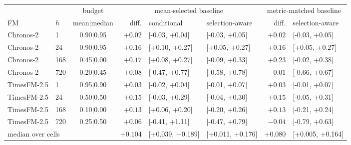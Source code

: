 \begin{tabular}{llcrllrl}
\toprule
 & & budget & \multicolumn{3}{c}{mean-selected baseline} & \multicolumn{2}{c}{metric-matched baseline} \\
\cmidrule(lr){4-6}\cmidrule(lr){7-8}
FM & $h$ & mean$|$median & diff. & conditional & selection-aware & diff. & selection-aware \\
\midrule
Chronos-2 & 1 & 0.90$|$0.95 & $+0.02$ & [-0.03, +0.04] & [-0.03, +0.05] & $+0.02$ & [-0.03, +0.05] \\
Chronos-2 & 24 & 0.90$|$0.95 & $+0.16$ & [+0.10, +0.27] & [+0.05, +0.27] & $+0.16$ & [+0.05, +0.27] \\
Chronos-2 & 168 & 0.45$|$0.00 & $+0.17$ & [+0.08, +0.27] & [-0.09, +0.33] & $+0.23$ & [-0.02, +0.38] \\
Chronos-2 & 720 & 0.20$|$0.45 & $+0.08$ & [-0.47, +0.77] & [-0.58, +0.78] & $-0.01$ & [-0.66, +0.67] \\
TimesFM-2.5 & 1 & 0.95$|$0.90 & $+0.03$ & [-0.02, +0.04] & [-0.01, +0.07] & $+0.03$ & [-0.01, +0.07] \\
TimesFM-2.5 & 24 & 0.50$|$0.50 & $+0.15$ & [-0.03, +0.29] & [-0.04, +0.30] & $+0.15$ & [-0.05, +0.31] \\
TimesFM-2.5 & 168 & 0.10$|$0.00 & $+0.13$ & [+0.06, +0.20] & [-0.20, +0.26] & $+0.13$ & [-0.21, +0.24] \\
TimesFM-2.5 & 720 & 0.25$|$0.50 & $+0.06$ & [-0.41, +1.11] & [-0.47, +0.79] & $-0.04$ & [-0.79, +0.63] \\
\midrule
\multicolumn{2}{l}{median over cells} &  & $+0.104$ & [+0.039, +0.189] & [+0.011, +0.176] & $+0.080$ & [+0.005, +0.164] \\
\bottomrule
\end{tabular}
